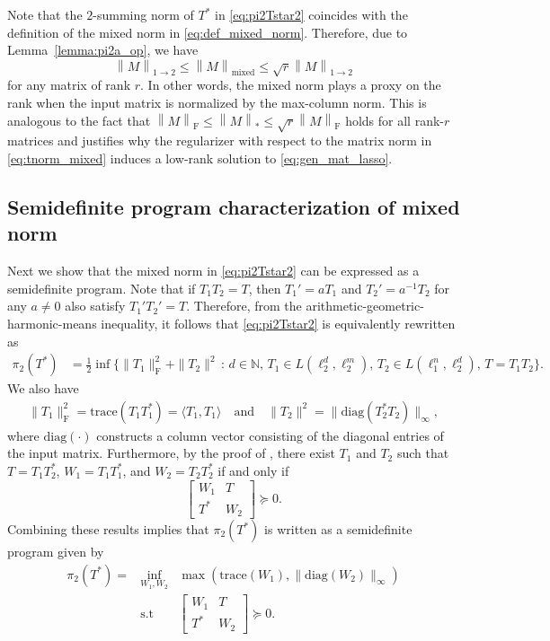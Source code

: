 \documentclass[11pt]{article}
\newcommand{\norm}[1]{\left \|#1 \right \|}
\begin{document}
Note that the $2$-summing norm of $T^*$ in \eqref{eq:pi2Tstar2} coincides with the definition of the mixed norm in \eqref{eq:def_mixed_norm}. 
Therefore, due to Lemma~\ref{lemma:pi2a_op}, we have
\[
\norm{M}_{1\to 2} \leq \norm{M}_\mathrm{mixed} \leq \sqrt{r} \norm{M}_{1\to 2} 
\]
for any matrix of rank $r$. 
In other words, the mixed norm plays a proxy on the rank when the input matrix is normalized by the max-column norm. 
This is analogous to the fact that $\norm{M}_\mathrm{F} \leq \norm{M}_* \leq \sqrt{r} \norm{M}_\mathrm{F}$ holds for all rank-$r$ matrices and justifies why the regularizer with respect to the matrix norm in \eqref{eq:tnorm_mixed} induces a low-rank solution to \eqref{eq:gen_mat_lasso}.

\subsection{Semidefinite program characterization of mixed norm}

Next we show that the mixed norm in \eqref{eq:pi2Tstar2} can be expressed as a semidefinite program. 
Note that if $T_1 T_2 = T$, then $T_1' = a T_1$ and $T_2' = a^{-1} T_2$ for any $a \neq 0$ also satisfy $T_1' T_2' = T$. 
Therefore, from the arithmetic-geometric-harmonic-means inequality, it follows that \eqref{eq:pi2Tstar2} is equivalently rewritten as 
\begin{equation*}
\begin{aligned}
\pi_2(T^*)
& = \frac{1}{2} \inf \{ \|T_1\|_\mathrm{F}^2 + \|T_2\|^2 \,:\, d \in \mathbb{N}, \, T_1 \in L(\ell_2^d,\ell_2^m), \, T_2 \in L(\ell_1^n,\ell_2^d), \, T = T_1 T_2 \}.
\end{aligned}
\end{equation*}
We also have
\begin{align*}
    \|T_1\|_\mathrm{F}^2 = \mathrm{trace}(T_1T_1^*) = \langle T_1, T_1 \rangle 
    \quad \text{and} \quad 
    \|T_2 \|^2 = \|\mathrm{diag}(T_2^* T_2) \|_\infty,
\end{align*} 
where $\mathrm{diag}(\cdot)$ constructs a column vector consisting of the diagonal entries of the input matrix.
Furthermore, by the proof of \cite[Lemma~3]{srebro2004maximum}, there exist $T_1$ and $T_2$ such that $T = T_1 T_2^*$, $W_1 = T_1 T_1^*$, and $W_2 = T_2 T_2^*$ if and only if 
\[
\begin{bmatrix} W_1 & T \\ T^* & W_2 \end{bmatrix} \succeq 0.
\]
Combining these results implies that $\pi_2(T^*)$ is written as a semidefinite program given by
\begin{equation}
\label{eq:mix_norm_semidefinite}
\begin{array}{lll}
\pi_2(T^*)
= & \displaystyle \underset{W_1, W_2}{\inf} & \max \left ( \mathrm{trace} (W_1) , \|\mathrm{diag}(W_2) \|_\infty \right ) \\
& \mathrm{s.t} & \begin{bmatrix} W_1 & T\\ T^* & W_2 \end{bmatrix} \succeq 0.
\end{array}
\end{equation}
\end{document}

